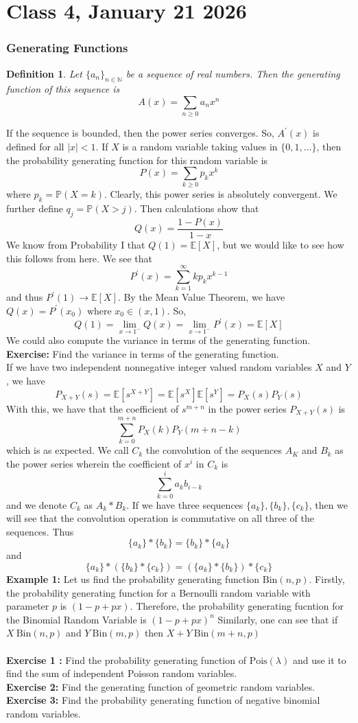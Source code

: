 \documentclass{article}
\newtheorem{definition}{Definition}
\begin{document}
\section*{Class 4, January 21 2026}
\subsubsection*{Generating Functions}
\begin{definition}
    Let $\{a_n\}_{n\in\mathbb{N}}$ be a sequence of real numbers. Then the generating function of this sequence is 
    $$A(x)=\sum_{n\geq 0}a_{n}x^n$$
\end{definition}
If the sequence is bounded, then the power series converges. So, $A^{'}(x)$ is defined for all $|x|<1$.
If $X$ is a random variable taking values in $\{0,1,...\}$, then the probability generating function for this random variable is
$$P(x)=\sum_{k\geq 0}p_{k}x^{k}$$
where $p_k=\mathbb{P}(X=k)$. Clearly, this power series is absolutely convergent. We further define $q_j=\mathbb{P}(X>j)$. Then calculations show that 
$$Q(x)=\frac{1-P(x)}{1-x}$$
    We know from Probability I that $Q(1)=\mathbb{E}[X]$, but we would like to see how this follows from here.
    We see that
    $$P^{'}(x)=\sum_{k=1}^{\infty}kp_k x^{k-1}$$
    and thus $P^{'}(1)\to \mathbb{E}[X]$. By the Mean Value Theorem, we have $Q(x)=P^{'}(x_{0}) \text{ where }x_0\in(x,1)$. So,
    $$Q(1)=\lim_{x\to 1^{-}}Q(x)=\lim_{x\to 1^{-}}P^{'}(x)=\mathbb{E}[X]$$
We could also compute the variance in terms of the generating function. \\
\textbf{Exercise: }Find the variance in terms of the generating function.\\
If we have two independent nonnegative integer valued random variables $X$ and $Y$, we have
$$P_{X+Y}(s)=\mathbb{E}[s^{X+Y}]=\mathbb{E}[s^X]\mathbb{E}[s^Y]=P_X(s)P_Y(s)$$
With this, we have that the coefficient of $s^{m+n}$ in the power series $P_{X+Y}(s)$ is $$\sum_{k=0}^{m+n}P_X(k)P_Y(m+n-k)$$ which is as expected.
We call $C_k$ the convolution of the sequences $A_K$ and $B_k$ as the power series wherein the coefficient of $x^i$ in $C_k$ is 
$$\sum_{k=0}^{i}a_k b_{i-k}$$
and we denote $C_k$ as $A_k*B_k$. If we have three sequences $\{a_k\},\{b_k\},\{c_k\}$, then we will see that the convolution operation is commutative on all three of the sequences. Thus
$$\{a_k\}*\{b_k\}=\{b_k\}*\{a_k\}$$ and $$\{a_k\}*(\{b_k\}*\{c_k\})=(\{a_k\}*\{b_k\})*\{c_k\}$$
\textbf{Example 1: }Let us find the probability generating function $\text{Bin}(n,p)$. Firstly, the probability generating function for a Bernoulli random variable with parameter $p$ is $(1-p+px)$. Therefore, the probability generating fucntion for the Binomial Random Variable is $(1-p+px)^n$
Similarly, one can see that if $X~\text{Bin}(n,p)$ and $Y~\text{Bin}(m,p)$ then $X+Y~\text{Bin}(m+n,p)$\\
\\
\textbf{Exercise 1 :} Find the probability generating function of $\text{Pois}(\lambda)$ and use it to find the sum of independent Poisson random variables.\\
\textbf{Exercise 2:} Find the generating function of geometric random variables.\\
\textbf{Exercise 3:} Find the probability generating function of negative binomial random variables.
\end{document}
